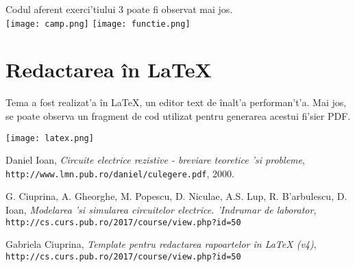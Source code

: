 \documentclass[titlepage, a4paper,12pt]{article}
\newcommand\TAB[1][1.2cm]{\hspace*{#1}} %
\begin{document}
Codul aferent exerci'tiului 3 poate fi observat mai jos. \\

\texttt{[image: camp.png]} \TAB
\texttt{[image: functie.png]} \\

\newpage

\section{Redactarea \^{i}n \LaTeX} \mbox{}

Tema a fost realizat'a \^{i}n \LaTeX, un editor text de \^{i}nalt'a performan't'a. Mai jos, se poate observa un fragment de cod utilizat pentru generarea acestui fi'sier PDF. \\

\begin{center}
\texttt{[image: latex.png]}
\end{center}

\newpage


\begin{thebibliography}{9}
Daniel Ioan,
\textit{Circuite electrice rezistive - breviare teoretice 'si probleme}, 
\\\texttt{http://www.lmn.pub.ro/daniel/culegere.pdf}, 2000.
 
G. Ciuprina, A. Gheorghe, M. Popescu, D. Niculae, A.S. Lup, R. B'arbulescu, D. Ioan,
\textit{Modelarea 'si simularea circuitelor electrice. 'Indrumar de laborator}, \\
\texttt{http://cs.curs.pub.ro/2017/course/view.php?id=50}
 
Gabriela Ciuprina,
\textit{Template pentru redactarea rapoartelor \^{i}n LaTeX (v4)}, \\
\texttt{http://cs.curs.pub.ro/2017/course/view.php?id=50}
\end{thebibliography}
\end{document}
